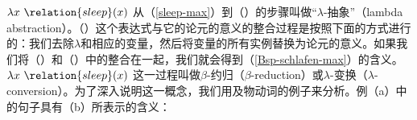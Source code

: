 \ea
$\lambda x~\relation{sleep}(x)$
\z
%
从（\ref{sleep-max}）到（）的步骤叫做“$\lambda$-抽象”（lambda abstraction）。（）这个表达式与它的论元的意义的整合过程是按照下面的方式进行的：我们去除$\lambda$和相应的变量，然后将变量的所有实例替换为论元的意义。如果我们将（）和（）中的整合在一起，我们就会得到（\ref{Bsp-schlafen-max}）的含义。
\ea
$\lambda x~\relation{sleep}(x)$ 
\z
这一过程叫做$\beta$-约归（$\beta$-reduction）或$\lambda$-变换（$\lambda$-conversion）。为了深入说明这一概念，我们用及物动词的例子来分析。例（a）中的句子具有（b）所表示的含义：
\eal
\ex\label{Bsp-Max-mag-Lotte} 
